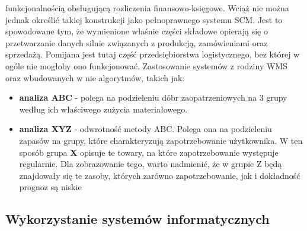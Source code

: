 		funkcjonalnością obsługującą rozliczenia finansowo-księgowe. Wciąż nie można jednak określić takiej
		konstrukcji jako pełnoprawnego systemu SCM. Jest to spowodowane tym, że wymienione właśnie części składowe
		opierają się o przetwarzanie danych silnie związanych z produkcją, zamówieniami oraz sprzedażą. Pomijana 
		jest tutaj część przedsiębiorstwa logistycznego, bez której w ogóle nie mogłoby ono funkcjonować.
		Zastosowanie systemów z rodziny WMS oraz wbudowanych w nie algorytmów, takich jak:
		\begin{itemize}
			\item \textbf{analiza ABC} - polega na podzieleniu dóbr zaopatrzeniowych na 3 grupy według ich właściwego zużycia materiałowego.
			\item \textbf{analiza XYZ} - odwrotność metody ABC. Polega ona na podzieleniu zapasów na grupy, które charakteryzują
			zapotrzebowanie użytkownika. W ten sposób grupa \textbf{X} opisuje te towary, na które zapotrzebowanie występuje regularnie.
			Dla zobrazowanie tego, warto nadmienić, że w grupie Z będą znajdowały się te zasoby, których zarówno zapotrzebowanie, 
			jak i dokładność prognoz są niskie 
		\end{itemize}
		
	\subsection{Wykorzystanie systemów informatycznych}

